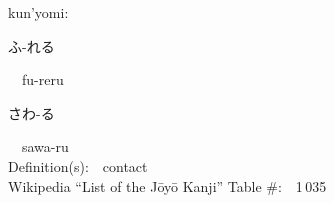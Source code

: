 \begin{multicols}{2}
{\hspace*{1em}}kun'yomi:\ \ \\
{\hspace*{2em}}{\begin{CJK}{UTF8}{min} ふ-れる \end{CJK}}\ \ fu-reru\ \ \\
{\hspace*{2em}}{\begin{CJK}{UTF8}{min} さわ-る \end{CJK}}\ \ sawa-ru\ \ \\
Definition(s):\ \ contact \\
Wikipedia ``List of the J\=oy\=o Kanji'' Table \#:\ \ 1\,035 \\
\ \ \\
\end{multicols}



